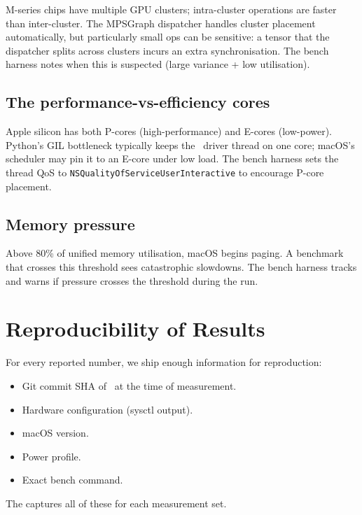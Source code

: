 M-series chips have multiple GPU clusters; intra-cluster
operations are faster than inter-cluster. The MPSGraph dispatcher
handles cluster placement automatically, but particularly small
ops can be sensitive: a tensor that the dispatcher splits across
clusters incurs an extra synchronisation. The bench harness
notes when this is suspected (large variance + low utilisation).

\subsection{The performance-vs-efficiency cores}
\label{ssec:perf_methodology:p_vs_e_cores}

Apple silicon has both P-cores (high-performance) and E-cores
(low-power). Python's GIL bottleneck typically keeps the
\Lucid\ driver thread on one core; macOS's scheduler may pin it
to an E-core under low load. The bench harness sets the thread
QoS to \texttt{NSQualityOfServiceUserInteractive} to encourage
P-core placement.

\subsection{Memory pressure}
\label{ssec:perf_methodology:memory_pressure}

Above 80\% of unified memory utilisation, macOS begins paging.
A benchmark that crosses this threshold sees catastrophic
slowdowns. The bench harness tracks  and warns
if pressure crosses the threshold during the run.

\section{Reproducibility of Results}
\label{sec:perf_methodology:reproducibility}

For every reported number, we ship enough information for
reproduction:

\begin{itemize}
  \item Git commit SHA of \Lucid\ at the time of measurement.
  \item Hardware configuration (sysctl output).
  \item macOS version.
  \item Power profile.
  \item Exact bench command.
\end{itemize}

The  captures
all of these for each measurement set.

